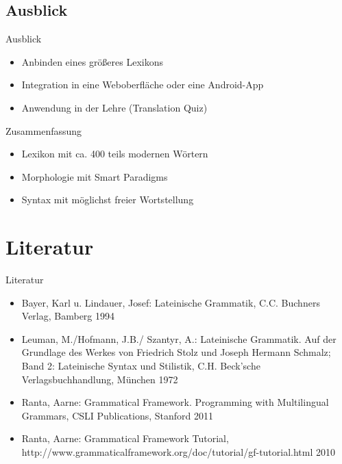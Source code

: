 \documentclass{beamer}
\begin{document}
\subsection{Ausblick}
\begin{frame}{Ausblick}
\begin{itemize}
\item Anbinden eines größeres Lexikons
\item Integration in eine Weboberfläche oder eine Android-App
\item Anwendung in der Lehre (Translation Quiz)
\end{itemize}
\end{frame}
\begin{frame}{Zusammenfassung}
\begin{itemize}
  \item Lexikon mit ca. 400 teils modernen Wörtern
  \item Morphologie mit Smart Paradigms
  \item Syntax mit möglichst freier Wortstellung
\end{itemize}
\end{frame}
\section{Literatur}
\begin{frame}{Literatur}
\begin{itemize}
  \item Bayer, Karl u. Lindauer, Josef: Lateinische Grammatik, C.C. Buchners Verlag, Bamberg 1994
  \item Leuman, M./Hofmann, J.B./ Szantyr, A.: Lateinische Grammatik. Auf der Grundlage des Werkes von Friedrich Stolz und Joseph Hermann Schmalz; Band 2: Lateinische Syntax und Stilistik, C.H. Beck'sche Verlagsbuchhandlung, München 1972
  \item Ranta, Aarne: Grammatical Framework. Programming with Multilingual Grammars, CSLI Publications, Stanford 2011 
  \item Ranta, Aarne: Grammatical Framework Tutorial, http://www.grammaticalframework.org/doc/tutorial/gf-tutorial.html 2010
\end{itemize}
\end{frame}
\end{document}
